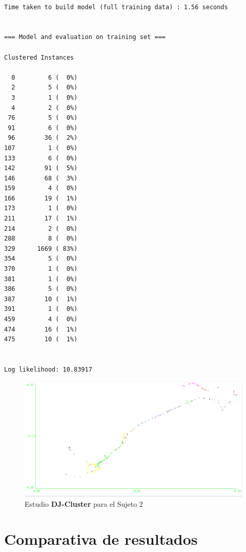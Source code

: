 \documentclass[a4paper, 12pt]{article}
\begin{document}
\begin{verbatim}

Time taken to build model (full training data) : 1.56 seconds


=== Model and evaluation on training set ===

Clustered Instances

  0         6 (  0%)
  2         5 (  0%)
  3         1 (  0%)
  4         2 (  0%)
 76         5 (  0%)
 91         6 (  0%)
 96        36 (  2%)
107         1 (  0%)
133         6 (  0%)
142        91 (  5%)
146        68 (  3%)
159         4 (  0%)
166        19 (  1%)
173         1 (  0%)
211        17 (  1%)
214         2 (  0%)
288         8 (  0%)
329      1669 ( 83%)
354         5 (  0%)
370         1 (  0%)
381         1 (  0%)
386         5 (  0%)
387        10 (  1%)
391         1 (  0%)
459         4 (  0%)
474        16 (  1%)
475        10 (  1%)


Log likelihood: 10.83917
\end{verbatim}

\begin{figure}[H]
	\includegraphics[scale=.5]{../comparativa/djClusterSujeto2.png}
	\caption{Estudio \textbf{DJ-Cluster} para el Sujeto 2}
\end{figure}


\pagebreak
\section{Comparativa de resultados}
\end{document}
